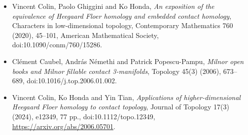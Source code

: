 \documentclass[11pt]{article}
\begin{document}
\begin{itemize}
\item [CGH20] Vincent Colin, Paolo Ghiggini and Ko Honda, \emph{An exposition of the equivalence of Heegaard Floer homology and embedded contact homology}, Characters in low-dimensional topology, Contemporary Mathematics 760 (2020), 45--101, American Mathematical Society, doi:10.1090/conm/760/15286.
\item [CNPP06] Clément Caubel, András Némethi and Patrick Popescu-Pampu, \emph{Milnor open books and Milnor fillable contact 3-manifolds}, Topology 45(3) (2006), 673--689, doi:10.1016/j.top.2006.01.002.
\item [CHT24] Vincent Colin, Ko Honda and Yin Tian, \emph{Applications of higher-dimensional Heegaard Floer homology to contact topology}, Journal of Topology 17(3) (2024), e12349, 77 pp., doi:10.1112/topo.12349, \url{https://arxiv.org/abs/2006.05701}.
\end{itemize}
\end{document}
